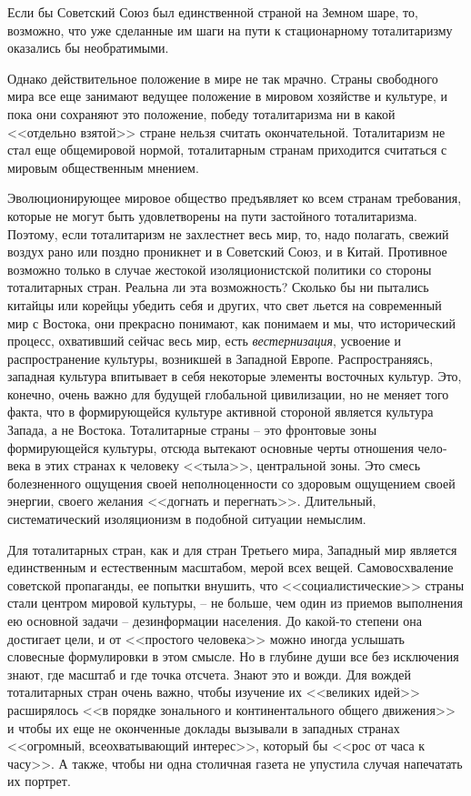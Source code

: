 \documentclass{book}
\begin{document}
Если бы Советский Союз был единственной страной на Земном шаре, то, возможно, что уже сделанные им шаги на пути к стационарному тоталитаризму оказались бы необратимыми.

Однако действительное положение в мире не так мрачно. Страны свободного мира все еще занимают ведущее положение в мировом хозяйстве и культуре, и пока они сохраняют это поло­жение, победу тоталитаризма ни в какой <<отдельно взятой>> стране нельзя считать окончательной. Тоталитаризм не стал еще общемировой нормой, тоталитарным странам приходится считаться с мировым общественным мнением.

Эволюционирующее мировое общество предъявляет ко всем странам требования, которые не могут быть удовлетво­рены на пути застойного тоталитаризма. Поэтому, если тотали­таризм не захлестнет весь мир, то, надо полагать, свежий воз­дух рано или поздно проникнет и в Советский Союз, и в Ки­тай. Противное возможно только в случае жестокой изоляци­онистской политики со стороны тоталитарных стран. Реальна ли эта возможность? Сколько бы ни пытались китайцы или ко­рейцы убедить себя и других, что свет льется на современный мир с Востока, они прекрасно понимают, как понимаем и мы, что исторический процесс, охвативший сейчас весь мир, есть \textit{вестернизация},  усвоение и распространение культуры, возник­шей в Западной Европе. Распространяясь, западная культура впитывает в себя некоторые элементы восточных культур. Это, конечно, очень важно для будущей глобальной цивили­зации, но не меняет того факта, что в формирующейся культу­ре активной стороной является культура Запада, а не Востока. Тоталитарные страны -- это фронтовые 
зоны формирующейся культуры, отсюда вытекают основные черты отношения чело­века в этих странах к человеку <<тыла>>, центральной зоны. Это смесь болезненного ощущения своей неполноценности со здо­ровым ощущением своей энергии, своего желания <<догнать и перегнать>>. Длительный, систематический изоляционизм в по­добной ситуации немыслим.

Для тоталитарных стран, как и для стран Третьего мира, Западный мир является единственным и естественным масшта­бом, мерой всех вещей. Самовосхваление советской пропаган­ды, ее попытки внушить, что <<социалистические>> страны ста­ли центром мировой культуры, -- не больше, чем один из при­емов выполнения ею основной задачи -- дезинформации насе­ления. До какой-то степени она достигает цели, и от <<простого человека>> можно иногда услышать словесные формулировки в этом смысле. Но в глубине души все без исключения знают, где масштаб и где точка отсчета. Знают это и вожди. Для вож­дей тоталитарных стран очень важно, чтобы изучение их <<вели­ких идей>> расширялось <<в порядке зонального и континенталь­ного общего движения>> и чтобы их еще не оконченные докла­ды вызывали в западных странах <<огромный, всеохватываю­щий интерес>>, который бы <<рос от часа к часу>>. А также, чтобы ни одна столичная газета не упустила случая напечатать их порт­рет.
\end{document}
